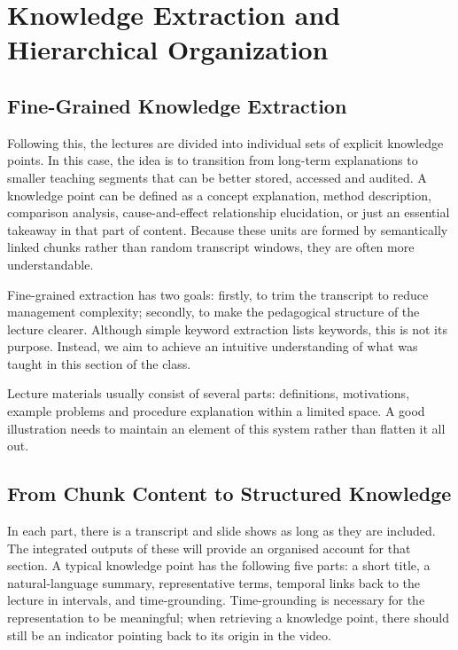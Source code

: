 \section{Knowledge Extraction and Hierarchical Organization}

\subsection{Fine-Grained Knowledge Extraction}

Following this, the lectures are divided into individual sets of explicit knowledge points. In this case, the idea is to transition from long-term explanations to smaller teaching segments that can be better stored, accessed and audited. A knowledge point can be defined as a concept explanation, method description, comparison analysis, cause-and-effect relationship elucidation, or just an essential takeaway in that part of content. Because these units are formed by semantically linked chunks rather than random transcript windows, they are often more understandable.

Fine-grained extraction has two goals: firstly, to trim the transcript to reduce management complexity; secondly, to make the pedagogical structure of the lecture clearer. Although simple keyword extraction lists keywords, this is not its purpose. Instead, we aim to achieve an intuitive understanding of what was taught in this section of the class.

Lecture materials usually consist of several parts: definitions, motivations, example problems and procedure explanation within a limited space. A good illustration needs to maintain an element of this system rather than flatten it all out.

\subsection{From Chunk Content to Structured Knowledge}

In each part, there is a transcript and slide shows as long as they are included. The integrated outputs of these will provide an organised account for that section. A typical knowledge point has the following five parts: a short title, a natural-language summary, representative terms, temporal links back to the lecture in intervals, and time-grounding. Time-grounding is necessary for the representation to be meaningful; when retrieving a knowledge point, there should still be an indicator pointing back to its origin in the video.

